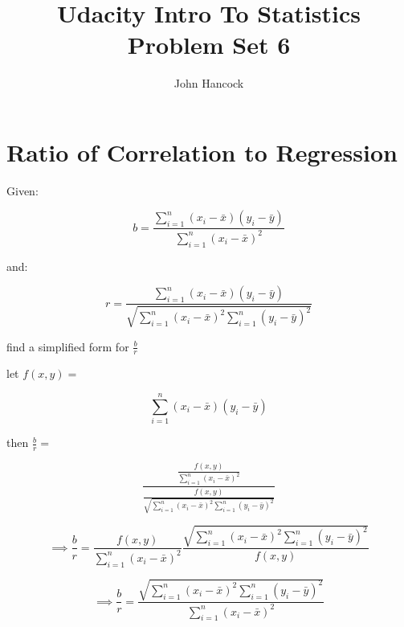 \documentclass[a4paper,11pt]{article}
\author{John Hancock}
\title{Udacity Intro To Statistics Problem Set 6}
\begin{document}
\maketitle
\tableofcontents
\section{Ratio of Correlation to Regression}
Given:

\begin{equation}
b = 
  \frac{ \sum_{i=1}^n \left(x_i - \bar{x}\right)\left(y_i - \bar{y}\right) } 
    { \sum_{i=1}^n \left(x_i - \bar{x} \right)^2 }
\end{equation}

and:

\begin{equation}
r = 
  \frac{ \sum_{i=1}^n \left(x_i - \bar{x}\right)\left(y_i - \bar{y}\right) }
   { \sqrt{\sum_{i=1}^n \left(x_i - \bar{x} \right)^2 
      \sum_{i=1}^n \left(y_i - \bar{y} \right)^2 } }
\end{equation}

find a simplified form for $\frac{b}{r}$

let $f\left( x,y \right ) = $

\begin{equation}
  \sum_{i=1}^n \left(x_i - \bar{x}\right)\left(y_i - \bar{y}\right) 
\end{equation}

then $\frac{b}{r} = $

\begin{equation}
  \frac{ 
    \frac { f \left( x,y \right) } { \sum_{i=1}^n \left(x_i - \bar{x} \right)^2 }
    }
    {\frac 
      { f \left( x,y \right) }
      {
        \sqrt{\sum_{i=1}^n \left(x_i - \bar{x} \right)^2 
        \sum_{i=1}^n \left(y_i - \bar{y} \right)^2 } 
      }
    }
\end{equation}


\begin{equation}
\implies
\frac{b}{r} = 
  \frac { f \left( x, y \right) } { \sum_{i=1}^n \left(x_i - \bar{x} \right)^2 }
  \frac  {
        \sqrt{\sum_{i=1}^n \left(x_i - \bar{x} \right)^2 
        \sum_{i=1}^n \left(y_i - \bar{y} \right)^2 } 
      }
      { f \left( x, y \right) }
\end{equation}

\begin{equation}
\implies
\frac{b}{r} = 
  \frac
    {
      \sqrt{\sum_{i=1}^n \left(x_i - \bar{x} \right)^2 
      \sum_{i=1}^n \left(y_i - \bar{y} \right)^2 } 
    }
    {
      \sum_{i=1}^n \left(x_i - \bar{x} \right)^2 
    }
\end{equation}
\end{document}
